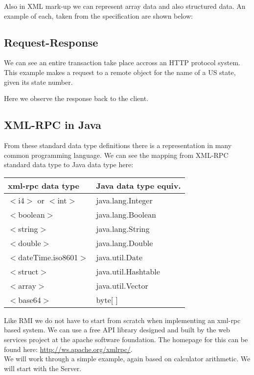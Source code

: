 \documentclass[12pt,a4paper]{article}
\begin{document}
Also in XML mark-up we can represent array data and also structured data. An example of each, taken from the specification are shown below:
\pagebreak


\subsection*{Request-Response}
We can see an entire transaction take place accross an HTTP protocol system. This example makes a request to a remote object for
the name of a US state, given its state number.

\pagebreak
Here we observe the response back to the client.


\subsection*{XML-RPC in Java}
From these standard data type definitions there is a representation in many common programming language. We can see the mapping from XML-RPC standard data type to Java data type here:
\begin{center}
\begin{tabular}{|l|l|}
\hline
xml-rpc data type & Java data type equiv. \\
\hline
\hline
$<$i4$>$ or $<$int$>$	 & java.lang.Integer \\	
$<$boolean$>$	 & java.lang.Boolean\\	
$<$string$>$	 & java.lang.String	\\
$<$double$>$	 & java.lang.Double	\\
$<$dateTime.iso8601$>$ & 	java.util.Date	\\
$<$struct$>$	 & java.util.Hashtable	\\
$<$array$>$	 & java.util.Vector	\\
$<$base64$>$	& byte[ ] \\
\hline
\end{tabular}
\end{center}
Like RMI we do not have to start from scratch when implementing an xml-rpc based system. We can use a free API library designed and built by the web services project at the apache software foundation. The homepage for this can be found here: \url{http://ws.apache.org/xmlrpc/}. \\

We will work through a simple example, again based on calculator arithmetic. We will start with the Server.
\end{document}
